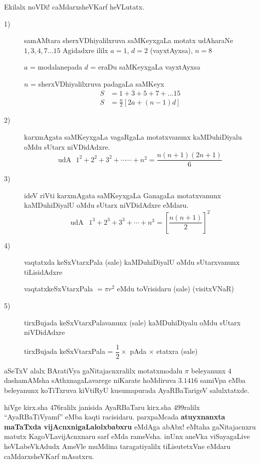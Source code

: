 Ekilalx noVDi! caMdarxsheVKarf heVLutatx.
\begin{description}
\item[{\rm 1})] samAMtara sherxVDhiyalilxruva saMKeyxgaLa motatx udAharaNe $1, 3, 4, 7 \ldots 15$ Agidadxre ililx $a=1$, $d=2$ (vayxtAyxsa), $n=8$

  $a$ = modalanepada $d$ = eraDu saMKeyxgaLa vayxtAyxsa

  $n$ = sherxVDhiyalilxruva padagaLa saMKeyx
  \begin{align*}
    S &= 1+3+5+7+ \ldots 15\\
    S &= \frac{n}{2} \left[2a+(n-1)d \right]
  \end{align*}


\item[{\rm 2})] karxmAgata saMKeyxgaLa vagaRgaLa motatxvanunx kaMDuhiDiyalu oMdu sUtarx niVDidAdxre.
  $$
\text{udA} ~~~ 1^2 + 2^2 + 3^2 + \cdots \cdots + n^2 = \frac{n (n+1) (2n+1)}{6}
$$

\item[{\rm 3})] ideV riVti karxmAgata saMKeyxgaLa GanagaLa motatxvanunx kaMDuhiDiyalU oMdu sUtarx niVDidAdxre eMdaru.
$$
\text{udA } ~~1^3 +2^3+3^3 + \cdots +n^3 = \left[\frac{n(n+1)}{2}\right]^2
$$


\item[{\rm 4})] vaqtatxda keSxVtarxPala (sale) kaMDuhiDiyalU oMdu sUtarxvanunx tiLisidAdxre

  vaqtatxkeSxVtarxPala $=\pi r^2$ eMdu toVrisidaru (sale) (visitxVNaR)
   

\item[{\rm 5})] tirxBujada keSxVtarxPalavanunx (sale) kaMDuhiDiyalu oMdu sUtarx niVDidAdxre

  tirxBujada keSxVtarxPala = $\dfrac{1}{2} \times $ pAda $\times$ etatxra (sale)
\end{description}

aSeTxV alalx BAratiVya gaNitajacnxralilx motatxmodalu $\pi$ beleyanunx $4$ dashamAMsha sAthxnagaLavarege niKarate hoMdiruva $3.1416$ samiVpa eMba beleyanunx koTiTxruva kiVtiRyU kusumapurada AyaRBaTarigeV salulxtatxde.

hiVge kirx.sha $476$ralilx janisida AyaRBaTaru kirx.sha $499$ralilx ``AyaRBaTiVyamf'' eMba kaqti racisidaru. parxpaMcada {\bf atuyxnanxta maTaTxda vijAcnxnigaLalolxbabxru} eMdAga abAbx! eMtaha gaNitajacnxru matutx KagoVLavijAcnxnaru sarf eMda rameVsha. inUnx aneVka viSayagaLive heVLabeVkAdudx AmeVle muMdina taragatiyalilx tiLisutetxVne eMdaru caMdarxsheVKarf mAsatxru.

